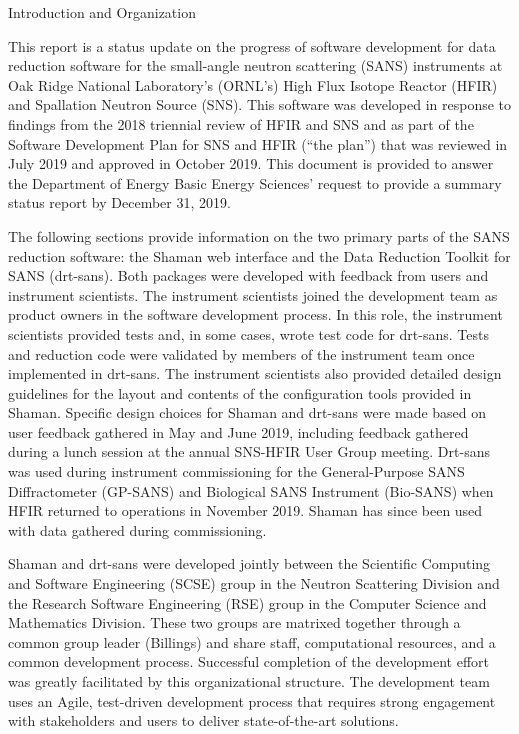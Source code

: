 Introduction and Organization

This report is a status update on the progress of software development for data reduction software
for the small-angle neutron scattering (SANS) instruments at Oak Ridge National Laboratory’s
(ORNL’s) High Flux Isotope Reactor (HFIR) and Spallation Neutron Source (SNS). This software was
developed in response to findings from the 2018 triennial review of HFIR and SNS and as part of the
Software Development Plan for SNS and HFIR (“the plan”) that was reviewed in July 2019 and approved
in October 2019. This document is provided to answer the Department of Energy Basic Energy Sciences’
request to provide a summary status report by December 31, 2019.

The following sections provide information on the two primary parts of the SANS reduction software:
the Shaman web interface and the Data Reduction Toolkit for SANS (drt-sans). Both packages were
developed with feedback from users and instrument scientists. The instrument scientists joined the
development team as product owners in the software development process. In this role, the instrument
scientists provided tests and, in some cases, wrote test code for drt-sans. Tests and reduction code
were validated by members of the instrument team once implemented in drt-sans. The instrument
scientists also provided detailed design guidelines for the layout and contents of the configuration
tools provided in Shaman. Specific design choices for Shaman and drt-sans were made based on user
feedback gathered in May and June 2019, including feedback gathered during a lunch session at the
annual SNS-HFIR User Group meeting. Drt-sans was used during instrument commissioning for the
General-Purpose SANS Diffractometer (GP-SANS) and Biological SANS Instrument (Bio-SANS) when HFIR
returned to operations in November 2019. Shaman has since been used with data gathered during
commissioning.

Shaman and drt-sans were developed jointly between the Scientific Computing and Software Engineering
(SCSE) group in the Neutron Scattering Division and the Research Software Engineering (RSE) group in
the Computer Science and Mathematics Division. These two groups are matrixed together through a
common group leader (Billings) and share staff, computational resources, and a common development
process. Successful completion of the development effort was greatly facilitated by this
organizational structure. The development team uses an Agile, test-driven development process that
requires strong engagement with stakeholders and users to deliver state-of-the-art solutions.

